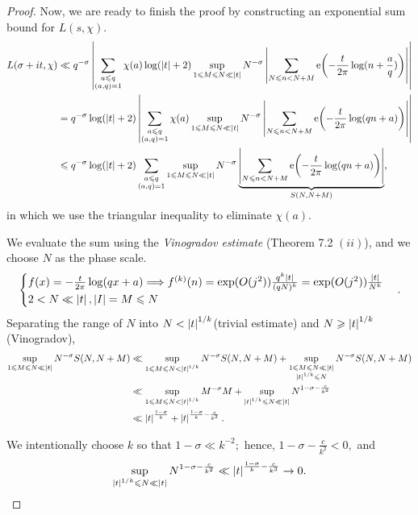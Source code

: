 \begin{proof}
Now, we are ready to finish the proof by constructing an exponential sum bound for $L(s, \chi).$
\begin{align*}
    L(\sigma + it, \chi) &\ll q^{-\sigma} \left\lvert \sum_{\substack{a \leqslant q \\ (a, q) =1}} \chi(a) \log(\left\lvert t \right\rvert + 2) \sup_{1 \leqslant M \leqslant N \ll \left\lvert t \right\rvert} N^{-\sigma} \left\lvert \sum_{N \leqslant n < N+M} \operatorname{e} \! \left( - \frac{t}{2\pi} \log(n + \frac{a}{q}) \right) \right\rvert \right\rvert \\
    &= q^{-\sigma} \log(\left\lvert t \right\rvert + 2) \left\lvert \sum_{\substack{a \leqslant q \\ (a, q) =1}} \chi(a) \sup_{1 \leqslant M \leqslant N \ll \left\lvert t \right\rvert} N^{-\sigma} \left\lvert \sum_{N \leqslant n < N+M} \operatorname{e} \! \left( - \frac{t}{2\pi} \log(qn + a) \right) \right\rvert \right\rvert \\
    &\leqslant q^{-\sigma} \log(\left\lvert t \right\rvert + 2) \sum_{\substack{a \leqslant q \\ (a, q) =1}} \sup_{1 \leqslant M \leqslant N \ll \left\lvert t \right\rvert} N^{-\sigma} \underbrace{\left\lvert \sum_{N \leqslant n < N+M} \operatorname{e} \! \left( - \frac{t}{2\pi} \log(qn+a) \right) \right\rvert}_{S(N, N+M)} ,
\end{align*}
in which we use the triangular inequality to eliminate $\chi(a).$

We evaluate the sum using the \emph{Vinogradov estimate} (Theorem 7.2 $(ii)$), and we choose $N$ as the phase scale.
\begin{equation*}
    \begin{cases}
        f(x) = -\frac{t}{2 \pi} \log(qx+a) \Longrightarrow f^{(k)}(n) = \exp(O(j^2)) \frac{q^k \left\lvert t \right\rvert}{(qN)^k} = \exp(O(j^2)) \frac{ \left\lvert t \right\rvert}{N^k} \\
        2 < N \ll \left\lvert t \right\rvert, \left\lvert I \right\rvert = M \leqslant N
    \end{cases}.
\end{equation*}
Separating the range of $N$ into $N < \left\lvert t \right\rvert^{1/k}$(trivial estimate) and $N \geqslant \left\lvert t \right\rvert^{1/k}$(Vinogradov),
\begin{align*}
    \sup_{1 \leqslant M \leqslant N \ll \left\lvert t \right\rvert} N^{-\sigma} S(N, N+M)  &\ll \sup_{1 \leqslant M \leqslant N < \left\lvert t \right\rvert^{1/k}} N^{-\sigma} S(N, N+M) + \sup_{\substack{1 \leqslant M \leqslant N \ll \left\lvert t \right\rvert \\ \left\lvert t \right\rvert^{1/k} \leqslant N}} N^{-\sigma} S(N, N+M) \\
    &\ll \sup_{1 \leqslant M \leqslant N < \left\lvert t \right\rvert^{1/k}} M^{-\sigma}M + \sup_{\left\lvert t \right\rvert^{1/k} \leqslant N \ll \left\lvert t \right\rvert} N^{1-\sigma-\frac{c}{k^2}} \\
    &\ll \left\lvert t \right\rvert^{\frac{1-\sigma}{k}} + \left\lvert t \right\rvert^{\frac{1-\sigma}{k}-\frac{c}{k^3}}.
\end{align*}

We intentionally choose $k$ so that $1 - \sigma \ll k^{-2};$ hence, $1-\sigma-\frac{c}{k^2} < 0,$ and $$\sup_{\left\lvert t \right\rvert^{1/k} \leqslant N \ll \left\lvert t \right\rvert} N^{1-\sigma-\frac{c}{k^2}} \ll \left\lvert t \right\rvert^{\frac{1-\sigma}{k}-\frac{c}{k^3}} \to 0.$$


\end{proof}
